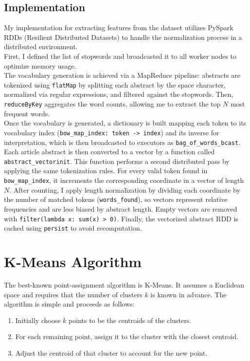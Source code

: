 \documentclass{report}
\begin{document}
\subsection{Implementation}
My implementation for extracting features from the dataset utilizes PySpark RDDs (Resilient Distributed Datasets) to handle the normalization process in a distributed environment.
\\
First, I defined the list of stopwords and broadcasted it to all worker nodes to optimize memory usage.
\\
The vocabulary generation is achieved via a MapReduce pipeline: abstracts are tokenized using \verb|flatMap| by splitting each abstract by the space character, normalized via regular expressions, and filtered against the stopwords. 
Then, \verb|reduceByKey| aggregates the word counts, allowing me to extract the top $N$ most frequent words.
\\
Once the vocabulary is generated, a dictionary is built mapping each token to its vocabulary index (\verb|bow_map_index: token -> index|) and its inverse for interpretation, which is then broadcasted to executors as \verb|bag_of_words_bcast|. 
\\
Each article abstract is then converted to a vector by a function called \verb|abstract_vectorinit|. This function performs a second distributed pass by applying the same tokenization rules. For every valid token found in \verb|bow_map_index|, it increments the corresponding coordinate in a vector of length $N$.  
After counting, I apply length normalization by dividing each coordinate by the number of matched tokens (\verb|words_found|), so vectors represent relative frequencies and are less biased by abstract length. Empty vectors are removed with \verb|filter(lambda x: sum(x) > 0)|. Finally, the vectorized abstract RDD is cached using \verb|persist| to avoid recomputation.

\section{K-Means Algorithm}
The best-known point-assignment algorithm is K-Means. It assumes a Euclidean space and requires that the number of clusters $k$ is known in advance. The algorithm is simple and proceeds as follows:
\begin{enumerate}
    \item Initially choose $k$ points to be the centroids of the clusters.
    \item For each remaining point, assign it to the cluster with the closest centroid.
    \item Adjust the centroid of that cluster to account for the new point.
\end{enumerate}
\end{document}
